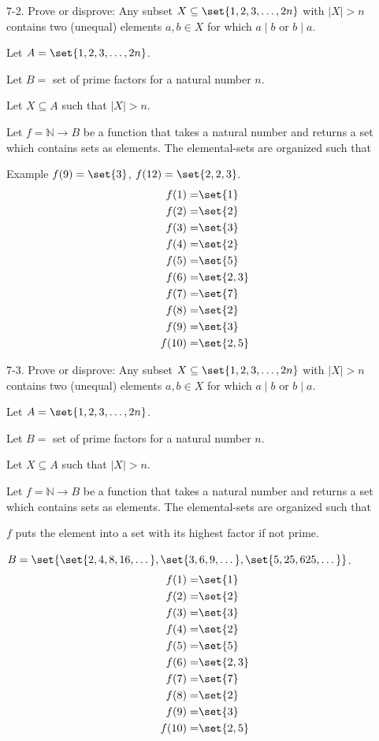 \documentclass{hippoidC}
\begin{document}
\begin{prooflist}{7-2. Prove or disprove: Any subset $X \subseteq\set{1,2,3, \ldots,
    2 n}$ with $|X|>n$ contains two (unequal) elements $a, b \in X$ for which
$a \mid b$ or $b \mid a$.}
\item Let $A=\set{1,2,3, \ldots, 2 n}$.
\item Let $B=$ set of prime factors for a natural number $n$.
\item Let $X\subseteq A$ such that $|X|>n$.
\item Let $f=\mathbb{N} \rightarrow B $ be a function that takes a natural
    number and returns a set which contains sets as elements. The elemental-sets
    are organized such that
\item Example $f(9) = \set{3}$, $f(12) = \set{2, 2, 3}$.
\begin{align*}
    f(1) =& \set{1}\\
    f(2) =& \set{2}\\
    f(3) =& \set{3}\\
    f(4) =& \set{2}\\
    f(5) =& \set{5}\\
    f(6) =& \set{2, 3}\\
    f(7) =& \set{7}\\
    f(8) =& \set{2}\\
    f(9) =& \set{3}\\
    f(10) =& \set{2, 5}
\end{align*}
\end{prooflist}

\begin{prooflist}{7-3. Prove or disprove: Any subset $X \subseteq\set{1,2,3, \ldots,
    2 n}$ with $|X|>n$ contains two (unequal) elements $a, b \in X$ for which
$a \mid b$ or $b \mid a$.}
\item Let $A=\set{1,2,3, \ldots, 2 n}$.
\item Let $B=$ set of prime factors for a natural number $n$.
\item Let $X\subseteq A$ such that $|X|>n$.
\item Let $f=\mathbb{N} \rightarrow B $ be a function that takes a natural
    number and returns a set which contains sets as elements. The elemental-sets
    are organized such that
\item $f$ puts the element into a set with its highest factor if not prime.
\item $B=\set{\set{2, 4, 8, 16,\dots}, \set{3, 6, 9, \dots}, \set{5, 25, 625,
    \dots}}$.
\begin{align*}
    f(1) =& \set{1}\\
    f(2) =& \set{2}\\
    f(3) =& \set{3}\\
    f(4) =& \set{2}\\
    f(5) =& \set{5}\\
    f(6) =& \set{2, 3}\\
    f(7) =& \set{7}\\
    f(8) =& \set{2}\\
    f(9) =& \set{3}\\
    f(10) =& \set{2, 5}
\end{align*}
\end{prooflist}
\end{document}
